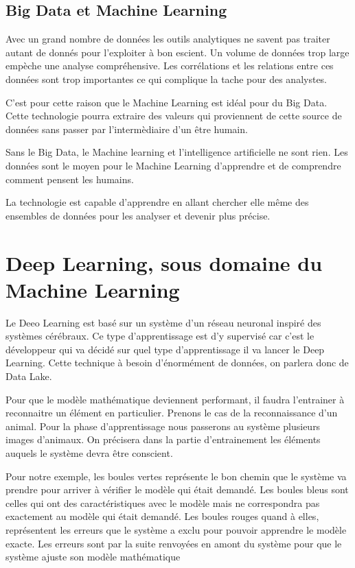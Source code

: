 \documentclass[12pt,a4paper]{report}
\begin{document}
\section{Big Data et Machine Learning}

Avec un grand nombre de données les outils analytiques ne savent pas traiter autant de donnés pour l'exploiter à bon escient. Un volume de données trop large empèche une analyse compréhensive. Les corrélations et les relations entre ces données sont trop importantes ce qui complique la tache pour des analystes. 

C'est pour cette raison que le Machine Learning est idéal pour du Big Data. Cette technologie pourra extraire des valeurs qui proviennent de cette source de données sans passer par l'intermèdiaire d'un être humain.

Sans le Big Data, le Machine learning et l'intelligence artificielle ne sont rien. Les données sont le moyen pour le Machine Learning d'apprendre et de comprendre comment pensent les humains. 

La technologie est capable d'apprendre en allant chercher elle même des ensembles de données pour les analyser et devenir plus précise.

\chapter{Deep Learning, sous domaine du Machine Learning}

Le Deeo Learning est basé sur un système d'un réseau neuronal inspiré des systèmes cérébraux. Ce type d'apprentissage est d'y supervisé car c'est le développeur qui va décidé sur quel type d'apprentissage il va lancer le Deep Learning. Cette technique à besoin d'énormément de données, on parlera donc de Data Lake. 

Pour que le modèle mathématique deviennent performant, il faudra l'entrainer à reconnaitre un élément en particulier. Prenons le cas de la reconnaissance d'un animal. Pour la phase d'apprentissage nous passerons au système plusieurs images d'animaux. On précisera dans la partie d'entrainement les éléments auquels le système devra être conscient.
\pagebreak

Pour notre exemple, les boules vertes représente le bon chemin que le système va prendre pour arriver à vérifier le modèle qui était demandé. Les boules bleus sont celles qui ont des caractéristiques avec le modèle mais ne correspondra pas exactement au modèle qui était demandé. Les boules rouges quand à elles, représentent les erreurs que le système a exclu pour pouvoir apprendre le modèle exacte. Les erreurs sont par la suite renvoyées en amont du système pour que le système ajuste son modèle mathématique
\end{document}
